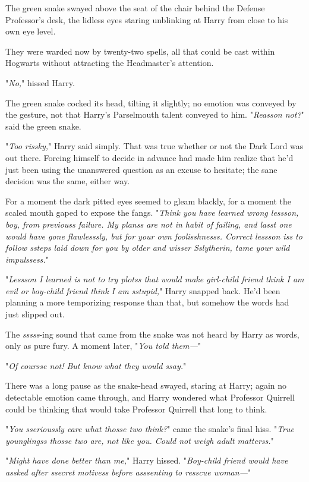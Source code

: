The green snake swayed above the seat of the chair behind the Defense 
Professor's desk, the lidless eyes staring unblinking at Harry from close to 
his own eye level.

They were warded now by twenty-two spells, all that could be cast within 
Hogwarts without attracting the Headmaster's attention.

"\emph{No,}" hissed Harry.

The green snake cocked its head, tilting it slightly; no emotion was conveyed 
by the gesture, not that Harry's Parselmouth talent conveyed to him. 
"\emph{Reasson not?}" said the green snake.

"\emph{Too rissky,}" Harry said simply. That was true whether or not the Dark 
Lord was out there. Forcing himself to decide in advance had made him realize 
that he'd just been using the unanswered question as an excuse to hesitate; the 
sane decision was the same, either way.

For a moment the dark pitted eyes seemed to gleam blackly, for a moment the 
scaled mouth gaped to expose the fangs. "\emph{Think you have learned wrong 
lessson, boy, from previouss failure. My planss are not in habit of failing, 
and lasst one would have gone flawlesssly, but for your own foolisshnesss. 
Correct lessson iss to follow ssteps laid down for you by older and wisser 
Sslytherin, tame your wild impulssess.}"

"\emph{Lessson I learned is not to try plotss that would make girl-child friend 
think I am evil or boy-child friend think I am sstupid,}" Harry snapped back. 
He'd been planning a more temporizing response than that, but somehow the words 
had just slipped out.

The \emph{sssss}-ing sound that came from the snake was not heard by Harry as 
words, only as pure fury. A moment later, "\emph{You told them---}"

"\emph{Of coursse not! But know what they would ssay.}"

There was a long pause as the snake-head swayed, staring at Harry; again no 
detectable emotion came through, and Harry wondered what Professor Quirrell 
could be thinking that would take Professor Quirrell that long to think.

"\emph{You sserioussly care what thosse two think?}" came the snake's final 
hiss. "\emph{True younglingss thosse two are, not like you. Could not weigh 
adult matterss.}"

"\emph{Might have done better than me,}" Harry hissed. "\emph{Boy-child friend 
would have assked after ssecret motivess before asssenting to resscue woman---}"

